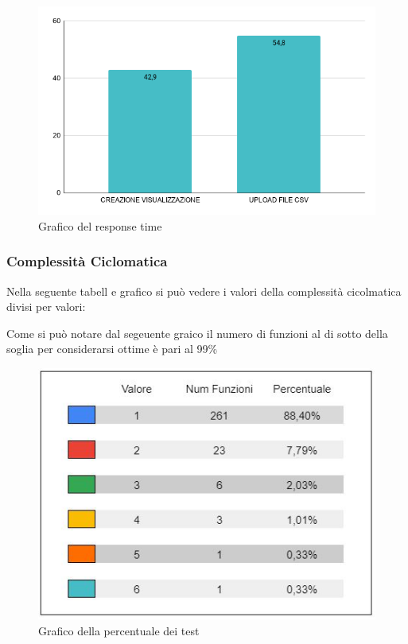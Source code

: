     \begin{figure}[H]
        \centering
        \includegraphics[width=10 cm]{source/sections/images/response-time.png}
        \caption{Grafico del response time}
    \end{figure}
    
\subsubsection{Complessità Ciclomatica}
    Nella seguente tabell e grafico si può vedere i valori della complessità cicolmatica divisi per valori:

        Come si può notare dal segeuente graico il numero di funzioni al di sotto della soglia per considerarsi ottime è pari al 99\%



    \begin{figure}[H]
        \centering
        \includegraphics[width=10 cm]{source/sections/images/tabella_CC.JPG}
        \caption{Grafico della percentuale dei test}
    \end{figure}

